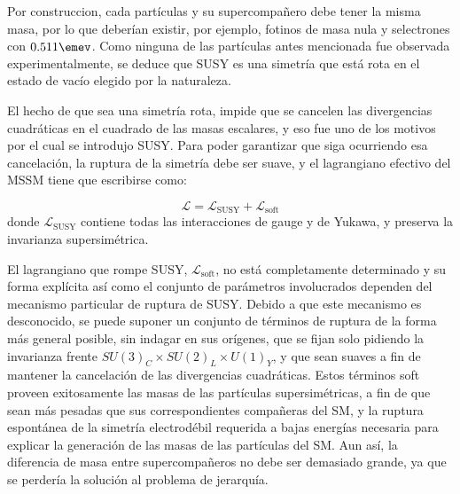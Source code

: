 Por construccion, cada partículas y su supercompañero debe tener la misma masa, por lo que deberían existir, por ejemplo, fotinos de masa nula y selectrones con $0.511 \emev$. Como ninguna de las partículas antes mencionada fue observada experimentalmente, se deduce que SUSY es una simetría que está rota en el estado de vacío elegido por la naturaleza.

El hecho de que sea una simetría rota, impide que se cancelen las divergencias cuadráticas en el cuadrado de las masas escalares, y eso fue uno de los motivos por el cual se introdujo SUSY. Para poder garantizar que siga ocurriendo esa cancelación, la ruptura de la simetría debe ser suave, y el lagrangiano efectivo del MSSM tiene que escribirse como:

\begin{equation}
\mathcal{L}=\mathcal{L}_{\text{SUSY}}+\mathcal{L}_{\text{soft}}
\end{equation}
donde $\mathcal{L}_{\text{SUSY}}$ contiene todas las interacciones de gauge y de Yukawa, y preserva la invarianza supersimétrica. 







El lagrangiano que rompe SUSY, $\mathcal{L}_{\text{soft}}$, no está completamente determinado y su forma explícita así como el conjunto de parámetros involucrados dependen del mecanismo particular de ruptura de SUSY. Debido a que este mecanismo es desconocido, se puede suponer un conjunto de términos de ruptura de la forma más general posible, sin indagar en sus orígenes, que se fijan solo pidiendo la invarianza frente $SU(3)_{C}\times SU(2)_{L}\times U(1)_{Y}$, y que sean suaves a fin de mantener la cancelación de las divergencias cuadráticas. Estos términos soft proveen exitosamente las masas de las partículas supersimétricas, a fin de que sean más pesadas que sus correspondientes compañeras del SM, y la ruptura espontánea de la simetría electrodébil requerida a bajas energías necesaria para explicar la generación de las masas de las partículas del SM. Aun así, la diferencia de masa entre supercompañeros no debe ser demasiado grande, ya que se perdería la solución al problema de jerarquía.

